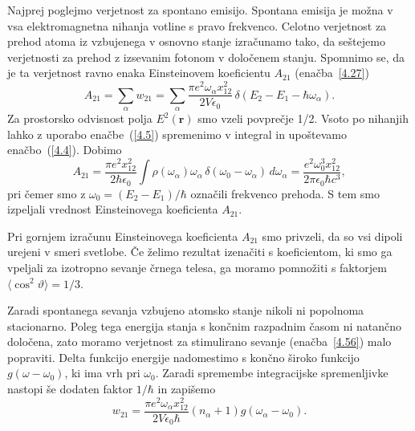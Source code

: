 Najprej poglejmo verjetnost za spontano emisijo. 
Spontana emisija je možna v vsa elektromagnetna nihanja votline s
pravo frekvenco. Celotno verjetnost za prehod atoma iz vzbujenega
v osnovno stanje izračunamo tako, da seštejemo verjetnosti za prehod z izsevanim fotonom 
v določenem stanju. Spomnimo se, da je ta verjetnost ravno enaka 
Einsteinovem koeficientu $A_{21}$ (enačba~\ref{4.27})
\begin{equation}
A_{21}=\sum_{\alpha}w_{21}=\sum_{\alpha}\frac{\pi 
e^{2}\omega_{\alpha}x_{12}^{2}}{2V\epsilon_{0}}\,\delta(E_{2}-E_{1}-\hbar\omega_{\alpha}).
\label{4.57}
\end{equation}
Za prostorsko odvisnost polja $E^{2}(\mathbf{r})$ smo vzeli povprečje
1/2. Vsoto po nihanjih lahko z uporabo enačbe~(\ref{4.5}) spremenimo v integral
in upoštevamo enačbo~(\ref{4.4}). Dobimo
\begin{equation}
A_{21}=\frac{\pi e^{2}x_{12}^{2}}{2\hbar\epsilon_{0}}\int\rho(\omega_{\alpha})\omega_\alpha\, 
\delta(\omega_{0}-\omega_{\alpha})\, d\omega_{\alpha}=\frac{e^{2}\omega_{0}^{3}x_{12}^{2}}{2\pi\epsilon_{0}\hbar c^{3}},
\label{4.58}
\end{equation}
 pri čemer smo z $\omega_{0}=(E_{2}-E_{1})/\hbar$ označili frekvenco prehoda. S tem smo 
 izpeljali vrednost Einsteinovega koeficienta $A_{21}$. 
\begin{remark}
Pri gornjem izračunu Einsteinovega koeficienta $A_{21}$ smo privzeli, da so vsi dipoli urejeni  
 v smeri svetlobe. Če želimo rezultat izenačiti s koeficientom, ki smo ga vpeljali
 za izotropno sevanje črnega telesa, ga moramo pomnožiti s faktorjem $\langle \cos^2\vartheta
 \rangle = 1/3$.
\end{remark}

Zaradi spontanega sevanja vzbujeno atomsko stanje nikoli ni popolnoma
stacionarno. Poleg tega energija stanja s končnim razpadnim časom ni natančno
določena, zato moramo verjetnost za stimulirano sevanje (enačba~\ref{4.56}) malo 
popraviti. Delta funkcijo energije nadomestimo s končno široko  
funkcijo $g(\omega-\omega_0)$, ki ima vrh pri $\omega_{0}$. Zaradi 
spremembe integracijske spremenljivke nastopi še dodaten faktor $1/\hbar$ in zapišemo
\begin{equation}
w_{21}=\frac{\pi e^{2}\omega_{\alpha}x_{12}^{2}}{2V\epsilon_{0}\hbar}
(n_{\alpha}+1)g(\omega_{\alpha}-\omega_0).
\label{4.59}
\end{equation}

